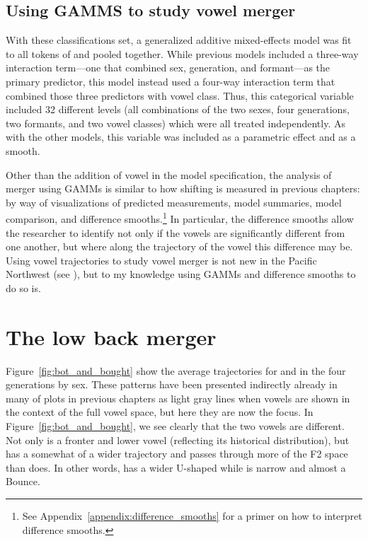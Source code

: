 \subsection{Using GAMMS to study vowel merger}

With these classifications set, a generalized additive mixed-effects model was fit to all tokens of \lot and \thought pooled together. While previous models included a three-way interaction term---one that combined sex, generation, and formant---as the primary predictor, this model instead used a four-way interaction term that combined those three predictors with vowel class. Thus, this categorical variable included 32 different levels (all combinations of the two sexes, four generations, two formants, and two vowel classes) which were all treated independently. As with the other models, this variable was included as a parametric effect and as a smooth.

Other than the addition of vowel in the model specification, the analysis of merger using GAMMs is similar to how shifting is measured in previous chapters: by way of visualizations of predicted measurements, model summaries, model comparison, and difference smooths.\footnote{See Appendix~\ref{appendix:difference_smooths} for a primer on how to interpret difference smooths.} In particular, the difference smooths allow the researcher to identify not only if the vowels are significantly different from one another, but where along the trajectory of the vowel this difference may be. Using vowel trajectories to study vowel merger is not new in the Pacific Northwest (see \citealt{freeman_2014}), but to my knowledge using GAMMs and difference smooths to do so is.

\section{The low back merger}
\label{low_back_merger}

Figure~\ref{fig:bot_and_bought} show the average trajectories for \lot and \thought in the four generations by sex. These patterns have been presented indirectly already in many of plots in previous chapters as light gray lines when vowels are shown in the context of the full vowel space, but here they are now the focus. In Figure~\ref{fig:bot_and_bought}, we see clearly that the two vowels are different. Not only is \lot a fronter and lower vowel (reflecting its historical distribution), but \thought has a somewhat of a wider trajectory and passes through more of the F2 space than \lot does. In other words, \thought has a wider U-shaped while \lot is narrow and almost a Bounce.

